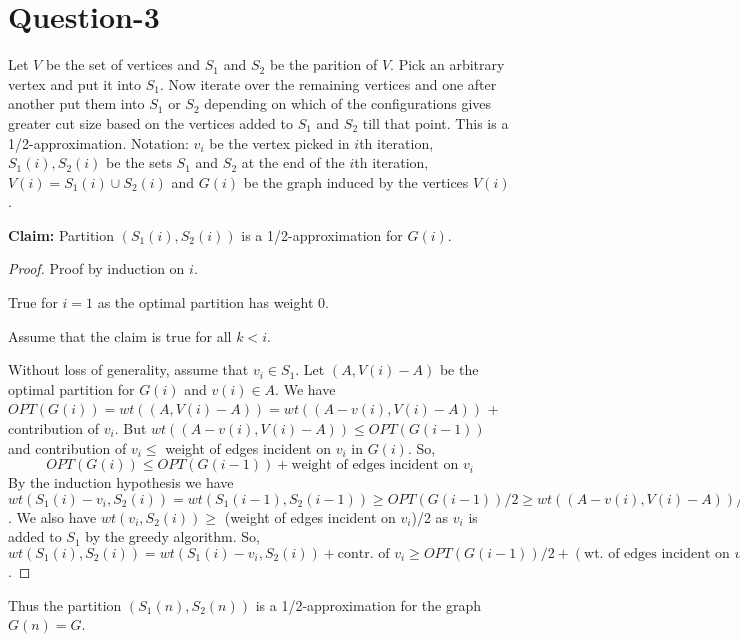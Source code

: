 \documentclass{article}
\begin{document}
\section{Question-3}
Let $V$ be the set of vertices and $S_1$ and $S_2$ be the parition of $V$. Pick an arbitrary vertex and put it into $S_1$. Now iterate over the remaining vertices and one after another put them into $S_1$ or
$S_2$ depending on which of the configurations gives greater cut size based on the vertices added to $S_1$ and $S_2$ till that point. This is a 1/2-approximation. 
Notation: $v_i$ be the vertex picked in $i$th iteration, $S_1(i), S_2(i)$ be the sets $S_1$ and $S_2$ at the end of the $i$th iteration, $V(i) = S_1(i) \cup S_2(i)$ and $G(i)$ be the graph induced by the vertices $V(i)$.

\noindent
\textbf{Claim:} Partition $(S_1(i),S_2(i))$ is a 1/2-approximation for $G(i)$. 
\begin{proof}
    Proof by induction on $i$.

    True for $i = 1$ as the optimal partition has weight $0$.
    
    Assume that the claim is true for all $k < i$.
    
    Without loss of generality, assume that $v_i \in S_1$. Let $(A,V(i)-A)$ be the optimal partition for $G(i)$ and $v(i) \in A$. We have $OPT(G(i)) = wt((A,V(i)-A)) = wt((A-v(i),V(i)-A))$ + contribution of $v_i$. 
    But $wt((A-v(i),V(i)-A)) \leq OPT(G(i-1))$ and contribution of $v_i \leq{}$ weight of edges incident on $v_i$ in $G(i)$. So,
    \begin{equation}
        OPT(G(i)) \leq OPT(G(i-1)) + \text{weight of edges incident on }v_i
    \end{equation}
        By the induction hypothesis we have $ wt(S_1(i)-v_i, S_2(i)) = wt(S_1(i-1),S_2(i-1)) \geq  OPT(G(i-1))/2 \geq wt((A-v(i),V(i)-A))/2$. We also have $wt(v_i,S_2(i)) \geq $ (weight of edges incident on $v_i$)/2 as $v_i$ is added to $S_1$ by the greedy algorithm. So, $wt(S_1(i),S_2(i)) = wt(S_1(i)-v_i,S_2(i)) + \text{contr. of } v_i \geq OPT(G(i-1))/2 + (\text{wt. of edges incident on } v_i)/2 \geq OPT(G(i))/2$.
\end{proof}
Thus the partition $(S_1(n),S_2(n))$ is a 1/2-approximation for the graph $G(n) = G$.
\end{document}
